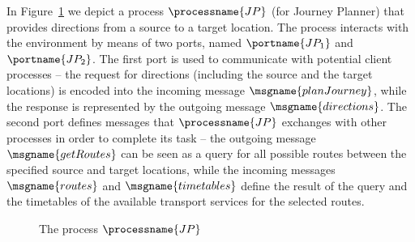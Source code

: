 \documentclass{LMCS}
\begin{document}
\begin{exa}
  \label{example:journey-planner-process}
  In Figure~\ref{figure:journey-planner-process} we depict a process \(\processname{JP}\) (for Journey Planner) that provides directions from a source to a target location. The process interacts with the environment by means of two ports, named \(\portname{JP_{1}}\) and \(\portname{JP_{2}}\).
  The first port is used to communicate with potential client processes -- the request for directions (including the source and the target locations) is encoded into the incoming message \(\msgname{planJourney}\), while the response is represented by the outgoing message \(\msgname{directions}\).
  The second port defines messages that \(\processname{JP}\) exchanges with other processes in order to complete its task -- the outgoing message \(\msgname{getRoutes}\) can be seen as a query for all possible routes between the specified source and target locations, while the incoming messages \(\msgname{routes}\) and \(\msgname{timetables}\) define the result of the query and the timetables of the available transport services for the selected routes.

  \begin{figure}[h]
    \centering
    

    \caption{The process \(\processname{JP}\)}
    \label{figure:journey-planner-process}
  \end{figure}
  

\end{exa}
\end{document}
